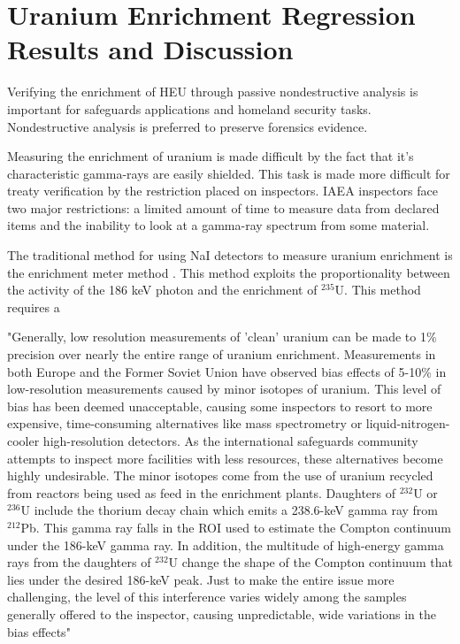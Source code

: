 \chapter{Uranium Enrichment Regression Results and Discussion}



Verifying the enrichment of HEU through passive nondestructive analysis is important for safeguards applications and homeland security tasks. Nondestructive analysis is preferred to preserve forensics evidence. 

Measuring the enrichment of uranium is made difficult by the fact that it's characteristic gamma-rays are easily shielded. This task is made more difficult for treaty verification by the restriction placed on inspectors. IAEA inspectors face two major restrictions: a limited amount of time to measure data from declared items and the inability to look at a gamma-ray spectrum from some material. 

The traditional method for using NaI detectors to measure uranium enrichment is the enrichment meter method \cite{Reilly1970}. This method exploits the proportionality between the activity of the 186 keV photon and the enrichment of $^{235}$U. This method requires a 

"Generally, low resolution measurements of 'clean' uranium can be made to 1\% precision over nearly the entire range of uranium enrichment. Measurements in both Europe and the Former Soviet Union have observed bias effects of 5-10\% in low-resolution measurements caused by minor isotopes of uranium. This level of bias has been deemed unacceptable, causing some inspectors to resort to more expensive, time-consuming alternatives like mass spectrometry or liquid-nitrogen-cooler high-resolution detectors. As the international safeguards community attempts to inspect more facilities with less resources, these alternatives become highly undesirable. The minor isotopes come from the use of uranium recycled from reactors being used as feed in the enrichment plants. Daughters of $^{232}$U or $^{236}$U include the thorium decay chain which emits a 238.6-keV gamma ray from $^{212}$Pb. This gamma ray falls in the ROI used to estimate the Compton continuum under the 186-keV gamma ray. In addition, the multitude of high-energy gamma rays from the daughters of $^{232}$U change the shape of the Compton continuum that lies under the desired 186-keV peak. Just to make the entire issue more challenging, the level of this interference varies widely among the samples generally offered to the inspector, causing unpredictable, wide variations in the bias effects" \cite{SPRINKLE1997}

